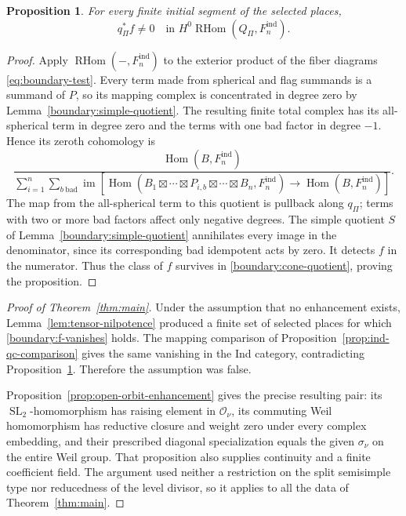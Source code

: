 \documentclass[11pt]{article}
\numberwithin{equation}{section}
\newtheorem{proposition}[theorem]{Proposition}
\theoremstyle{definition}
\theoremstyle{remark}
\newcommand{\Hom}{\operatorname{Hom}}
\newcommand{\RHom}{\operatorname{RHom}}
\newcommand{\SL}{\operatorname{SL}}
\begin{document}
\begin{proposition}\label{boundary:f-survives}
For every finite initial segment of the selected places,
\[
 q_\Pi^*f\ne0\quad\text{in }
 H^0\RHom(Q_\Pi,F_n^{\mathrm{ind}}).
\]
\end{proposition}

\begin{proof}
Apply $\RHom(-,F_n^{\mathrm{ind}})$ to the exterior product of the fiber
diagrams \eqref{eq:boundary-test}.  Every term made from spherical and
flag summands is a summand of $P$, so its mapping complex is concentrated
in degree zero by Lemma~\ref{boundary:simple-quotient}.  The resulting
finite total complex has its all-spherical term in degree zero and the
terms with one bad factor in degree $-1$.  Hence its zeroth cohomology is
\begin{equation}\label{boundary:cone-quotient}
 \frac{\Hom(B,F_n^{\mathrm{ind}})}{
 \displaystyle\sum_{i=1}^n\sum_{b\ \mathrm{bad}}
 \operatorname{im}\left[
 \Hom(B_1\boxtimes\cdots\boxtimes P_{i,b}\boxtimes\cdots\boxtimes B_n,
        F_n^{\mathrm{ind}})
 \longrightarrow\Hom(B,F_n^{\mathrm{ind}})\right]}.
\end{equation}
The map from the all-spherical term to this quotient is pullback along
$q_\Pi$; terms with two or more bad factors affect only negative
degrees.  The simple quotient $S$ of
Lemma~\ref{boundary:simple-quotient} annihilates every image in the
denominator, since its corresponding bad idempotent acts by zero.
It detects $f$ in the numerator.  Thus the class of $f$ survives in
\eqref{boundary:cone-quotient}, proving the proposition.
\end{proof}

\begin{proof}[Proof of Theorem~\ref{thm:main}]
Under the assumption that no enhancement exists,
Lemma~\ref{lem:tensor-nilpotence} produced a finite set of selected
places for which \eqref{boundary:f-vanishes} holds.  The mapping
comparison of Proposition~\ref{prop:ind-qc-comparison} gives the same
vanishing in the Ind category, contradicting
Proposition~\ref{boundary:f-survives}.  Therefore the assumption was
false.

Proposition~\ref{prop:open-orbit-enhancement} gives the precise resulting
pair: its $\SL_2$-homomorphism has raising element in $\mathcal O_\nu$,
its commuting Weil homomorphism has reductive closure and weight zero
under every complex embedding, and their prescribed diagonal
specialization equals the given $\sigma_\nu$ on the entire Weil group.
That proposition also supplies continuity and a finite coefficient
field.  The argument used neither a restriction on the split
semisimple type nor reducedness of the level divisor, so it applies to
all the data of Theorem~\ref{thm:main}.
\end{proof}
\end{document}
